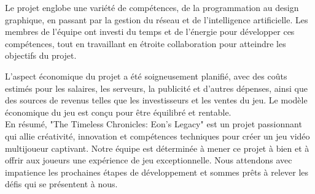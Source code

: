 \documentclass{article}
\begin{document}
Le projet englobe une variété de compétences, de la programmation au design graphique, en passant par la gestion du réseau et de l'intelligence artificielle. Les membres de l'équipe ont investi du temps et de l'énergie pour développer ces compétences, tout en travaillant en étroite collaboration pour atteindre les objectifs du projet.

L'aspect économique du projet a été soigneusement planifié, avec des coûts estimés pour les salaires, les serveurs, la publicité et d'autres dépenses, ainsi que des sources de revenus telles que les investisseurs et les ventes du jeu. Le modèle économique du jeu est conçu pour être équilibré et rentable.\\

En résumé, "The Timeless Chronicles: Eon's Legacy" est un projet passionnant qui allie créativité, innovation et compétences techniques pour créer un jeu vidéo multijoueur captivant. Notre équipe est déterminée à mener ce projet à bien et à offrir aux joueurs une expérience de jeu exceptionnelle. Nous attendons avec impatience les prochaines étapes de développement et sommes prêts à relever les défis qui se présentent à nous.\\
\end{document}
